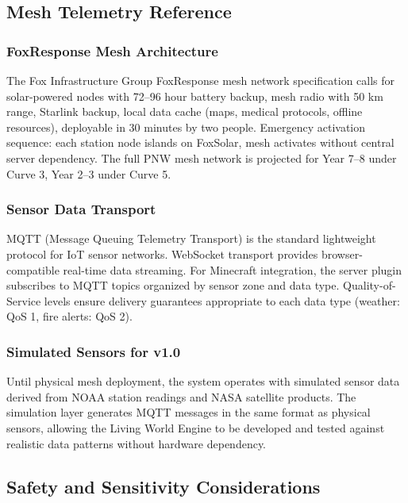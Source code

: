 \documentclass[11pt,letterpaper]{article}
\begin{document}
\subsection{Mesh Telemetry Reference}

\subsubsection{FoxResponse Mesh Architecture}
The Fox Infrastructure Group FoxResponse mesh network specification calls for solar-powered nodes with 72--96 hour battery backup, mesh radio with 50 km range, Starlink backup, local data cache (maps, medical protocols, offline resources), deployable in 30 minutes by two people. Emergency activation sequence: each station node islands on FoxSolar, mesh activates without central server dependency. The full PNW mesh network is projected for Year 7--8 under Curve 3, Year 2--3 under Curve 5.

\subsubsection{Sensor Data Transport}
MQTT (Message Queuing Telemetry Transport) is the standard lightweight protocol for IoT sensor networks. WebSocket transport provides browser-compatible real-time data streaming. For Minecraft integration, the server plugin subscribes to MQTT topics organized by sensor zone and data type. Quality-of-Service levels ensure delivery guarantees appropriate to each data type (weather: QoS 1, fire alerts: QoS 2).

\subsubsection{Simulated Sensors for v1.0}
Until physical mesh deployment, the system operates with simulated sensor data derived from NOAA station readings and NASA satellite products. The simulation layer generates MQTT messages in the same format as physical sensors, allowing the Living World Engine to be developed and tested against realistic data patterns without hardware dependency.

\subsection{Safety and Sensitivity Considerations}
\end{document}
